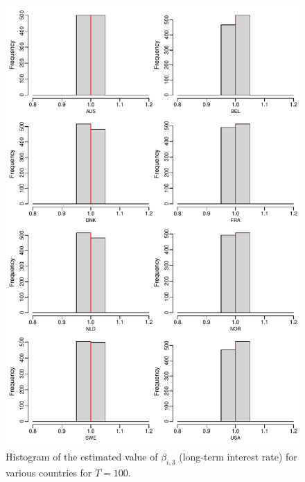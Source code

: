 \documentclass[a4paper,12pt]{article}
\begin{document}
\begin{enumerate}[label=\arabic*.,leftmargin=0.6cm]
{\begin{itemize}[topsep=0pt]
\begin{figure}[p!]
\begin{minipage}[t]{0.48\textwidth}
\includegraphics[width=\textwidth]{output/beta_ltrate_T_100}
\caption{Histogram of the estimated value of $\beta_{i, 3}$ (long-term interest rate) for various countries for $T = 100$.}\label{fig:para:ltrate:100}
\end{minipage}
\hspace{0.1cm}
\begin{minipage}[t]{0.48\textwidth}

\end{minipage}
\end{figure}
\end{itemize}}
\end{enumerate}
\end{document}
